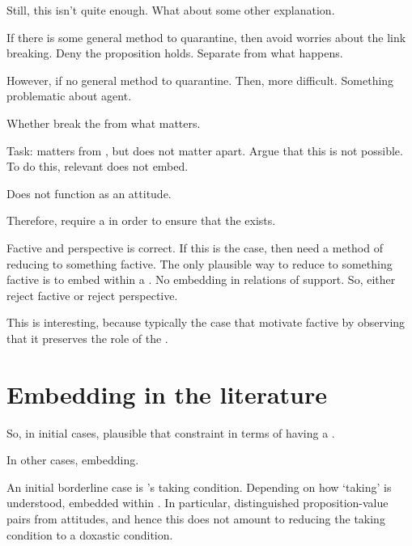 \begin{note}
  Still, this isn't quite enough.
  What about some other explanation.

  If there is some general method to quarantine, then avoid worries about the link breaking.
  Deny the proposition holds.
  Separate \agpe{} from what happens.

  However, if no general method to quarantine.
  Then, more difficult.
  Something problematic about agent.

  Whether break the \agpe{} from what matters.

  Task: \fc{} matters from \agpe{}, but does not matter apart.
  Argue that this is not possible.
  To do this, relevant \fc{} does not embed.

  Does not function as an attitude.
\end{note}

\begin{note}
  Therefore, require a \wit{} in order to ensure that the \ros{} exists.
\end{note}

\begin{note}
  Factive and perspective is correct.
  If this is the case, then need a method of reducing to something factive.
  The only plausible way to reduce to something factive is to embed within a \ros{}.
  No embedding in relations of support.
  So, either reject factive or reject perspective.

  This is interesting, because typically the case that motivate factive by observing that it preserves the role of the \agpe{}.
\end{note}


\section{Embedding in the literature}
\label{cha:var:sec:embedding}

\begin{note}
  So, in initial cases, plausible that constraint in terms of having a \wit{}.

  In other cases, embedding.
\end{note}

\begin{note}
  An initial borderline case is \citeauthor{Boghossian:2014aa}'s taking condition.
  Depending on how `taking' is understood, embedded within \ros{}.
  In particular, distinguished proposition-value pairs from attitudes, and hence this does not amount to reducing the taking condition to a doxastic condition.
\end{note}

